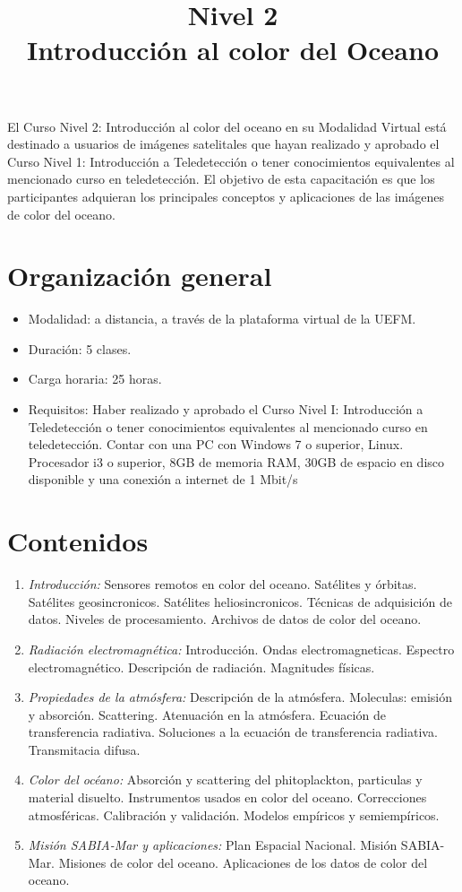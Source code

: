 \documentclass[a4paper,12pt]{article}
\title{ {\large Nivel 2} \\ Introducción al color del Oceano}
\author{}
\date{}
\begin{document}
\maketitle
%
\vskip-2.2cm
El Curso Nivel 2: Introducción al color del oceano en su Modalidad Virtual está destinado a usuarios de imágenes satelitales que hayan realizado y aprobado el Curso Nivel 1: Introducción a Teledetección o tener conocimientos equivalentes al mencionado curso en teledetección. El objetivo de esta capacitación es que los participantes adquieran los principales conceptos y aplicaciones de las imágenes de color del oceano. 
\section*{Organización general}
\begin{itemize}
    \item Modalidad: a distancia, a través de la plataforma virtual de la UEFM.
    \item Duración: 5 clases.
    \item Carga horaria: 25 horas.
    \item Requisitos: Haber realizado y aprobado el Curso Nivel I: Introducción a Teledetección o tener conocimientos equivalentes al mencionado curso en teledetección. Contar con una PC con Windows 7 o superior, Linux. Procesador i3 o superior, 8GB de memoria RAM, 30GB de espacio en disco disponible y una conexión a internet de 1 Mbit/s
        
\end{itemize}

\section*{Contenidos}
\begin{enumerate}[leftmargin=*, label={Clase \arabic* -}]
    \item \emph{Introducción:}
    Sensores remotos en color del oceano. Satélites y órbitas. Satélites geosincronicos. Satélites heliosincronicos. Técnicas de adquisición de datos. Niveles de procesamiento. Archivos de datos de color del oceano.
    \item \emph{Radiación electromagnética:}
    Introducción. Ondas electromagneticas. Espectro electromagnético. Descripción de radiación. Magnitudes físicas.
    \item \emph{Propiedades de la atmósfera:}
    Descripción de la atmósfera. Moleculas: emisión y absorción. Scattering. Atenuación en la atmósfera. Ecuación de transferencia radiativa. Soluciones a la ecuación de transferencia radiativa. Transmitacia difusa.
    \item \emph{Color del océano:}
    Absorción y scattering del phitoplackton, particulas y material disuelto. Instrumentos usados en color del oceano. Correcciones atmosféricas. Calibración y validación. Modelos empíricos y semiempíricos. 
    \item \emph{Misión SABIA-Mar y aplicaciones:}
    Plan Espacial Nacional. Misión SABIA-Mar. Misiones de color del oceano. Aplicaciones de los datos de color del oceano.
\end{enumerate}
\end{document}
